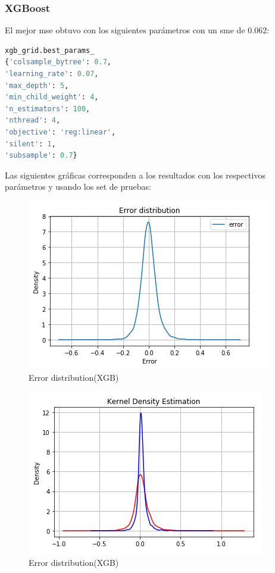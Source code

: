 \newpage
\subsubsection{XGBoost}
El mejor m se obtuvo con los siguientes par\'ametros con un sme de 0.062:
\begin{lstlisting}[language=Python]
xgb_grid.best_params_
{'colsample_bytree': 0.7, 
'learning_rate': 0.07, 
'max_depth': 5, 
'min_child_weight': 4, 
'n_estimators': 100, 
'nthread': 4, 
'objective': 'reg:linear', 
'silent': 1, 
'subsample': 0.7}
\end{lstlisting}
Las siguientes gr\'aficas corresponden a los resultados con los respectivos par\'ametros y usando los set de pruebas:
\begin{figure}[h!]
	\centering
	\includegraphics[width=0.8\linewidth]{Figure/xgbregresor_results.png}
	\caption{Error distribution(XGB)} 
	\label{fig:xgbregresor}
\end{figure}
\begin{figure}[h!]
	\centering
	\includegraphics[width=1\linewidth]{Figure/xgbregresorKernel_results.png}
	\caption{Error distribution(XGB)} 
	\label{fig:xgbregresorKernel_results}
\end{figure}
